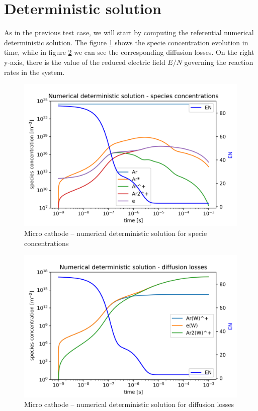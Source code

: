 \section{Deterministic solution}

As in the previous test case, we will start by computing the referential numerical deterministic solution. The figure \ref{fig:MicroCathodeImprovedDeterministic} shows the specie concentration evolution in time, while in figure \ref{fig:MicroCathodeImprovedDeterministicLosses} we can see the corresponding diffusion losses. On the right y-axis, there is the value of the reduced electric field $E/N$ governing the reaction rates in the system.

\begin{figure} 
    \centering
    \includegraphics[width=\textwidth]{grafy/MicroCathodeImprovedDeterministic.png}
    \caption{Micro cathode -- numerical deterministic solution for specie concentrations}
    \label{fig:MicroCathodeImprovedDeterministic}
\end{figure}

\begin{figure} 
    \centering
    \includegraphics[width=\textwidth]{grafy/MicroCathodeImprovedDeterministicLosses.png}
    \caption{Micro cathode -- numerical deterministic solution for diffusion losses}
    \label{fig:MicroCathodeImprovedDeterministicLosses}
\end{figure}



